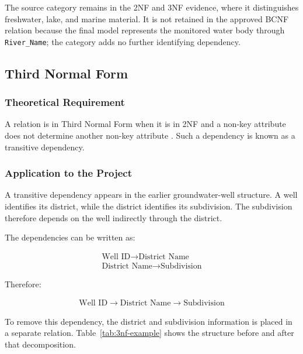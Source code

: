 The source category remains in the 2NF and 3NF evidence, where it distinguishes
freshwater, lake, and marine material. It is not retained in the approved BCNF
relation because the final model represents the monitored water body through
\texttt{River\_Name}; the category adds no further identifying dependency.

\subsection{Third Normal Form}
\label{subsec:third-normal-form}

\subsubsection{Theoretical Requirement}

A relation is in Third Normal Form when it is in 2NF and a non-key attribute
does not determine another non-key attribute \cite{kent1983five}. Such a
dependency is known as a transitive dependency.

\subsubsection{Application to the Project}

A transitive dependency appears in the earlier groundwater-well structure. A
well identifies its district, while the district identifies its subdivision.
The subdivision therefore depends on the well indirectly through the district.

The dependencies can be written as:

\begin{gather*}
\text{Well ID}\rightarrow\text{District Name}\\
\text{District Name}\rightarrow\text{Subdivision}
\end{gather*}

Therefore:

\begin{gather*}
\text{Well ID}\rightarrow\text{District Name}\rightarrow\text{Subdivision}
\end{gather*}

To remove this dependency, the district and subdivision information is placed
in a separate relation. Table~\ref{tab:3nf-example} shows the structure before
and after that decomposition.

